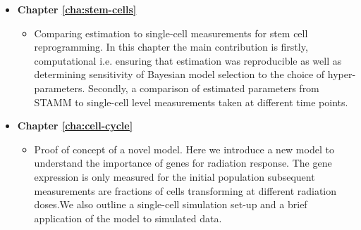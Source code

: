 \begin{itemize}
\begin{itemize}
\end{itemize}
\item {\bf Chapter \ref{cha:stem-cells}}
  \begin{itemize}
  \item Comparing estimation to single-cell measurements for stem cell reprogramming. In this chapter the main contribution is firstly, computational i.e. ensuring that estimation was reproducible as well as determining sensitivity of Bayesian model selection to the choice of hyper-parameters. Secondly, a comparison of estimated parameters from STAMM to single-cell level measurements taken at different time points.
  \end{itemize}

\item {\bf Chapter \ref{cha:cell-cycle}}
  \begin{itemize}
  \item Proof of concept of a novel model. Here we introduce a new model to understand the importance of genes for radiation response. The gene expression is only measured for the initial population subsequent measurements are fractions of cells transforming at different radiation doses.We also outline a single-cell simulation set-up and a brief application of the model to simulated data.
  \end{itemize}
\end{itemize}




